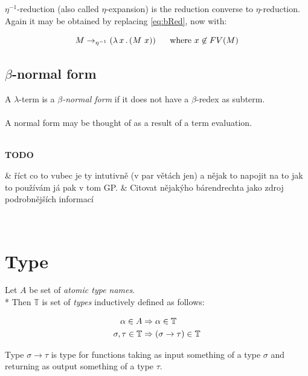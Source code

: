 \documentclass[12pt,a4paper]{report}
\newcommand{\lterm}{$\lambda$-term\xspace}
\newenvironment{todo}
{ ~\\[0.5em]
  \textbf{TODO}
  \begin{easylist}[itemize]}
{ \end{easylist}
  ~}
\begin{document}
$\eta^{-1}$-reduction (also called $\eta$-expansion) is 
the reduction converse to $\eta$-reduction.
Again it may be obtained by replacing \ref{eq:bRed}, now with:  

$$M \rightarrow_{\eta^{-1}} ( \lambda \, x \, . \, (M~x) ) \text{ ~~~~where } x \not\in FV(M) $$




\subsection{$\beta$-normal form}

A \lterm is a \textit{$\beta$-normal form} if it does not have a $\beta$-redex as
subterm.
\\\\
A normal form may be thought of as a result of a term evaluation. 



\begin{todo}
	& říct co to vubec je ty intutivně (v par větách jen) 
	  a nějak to napojit na to jak to používám já
	  pak v tom GP.
	& Citovat nějakýho bárendrechta jako zdroj podrobnějších informací
\end{todo}



\section{Type}
\label{deftype}

\newcommand{\ar}{\rightarrow\xspace}
\newcommand{\T}{\mathbb{T}\xspace}

Let $A$ be set of {\it atomic type names}. \\*
Then $\mathbb{T}$ is set of {\it types} inductively defined as follows:

\begin{align*}
\alpha      \in A  &\then   \alpha \in \T \\
\sigma,\tau \in \T &\then ( \sigma \ar  \tau ) \in \T 
\end{align*} 

Type $\sigma \ar \tau$ is type for functions taking as input
something of a type $\sigma$ and returning 
as output something of a type $\tau$. \\
\end{document}
